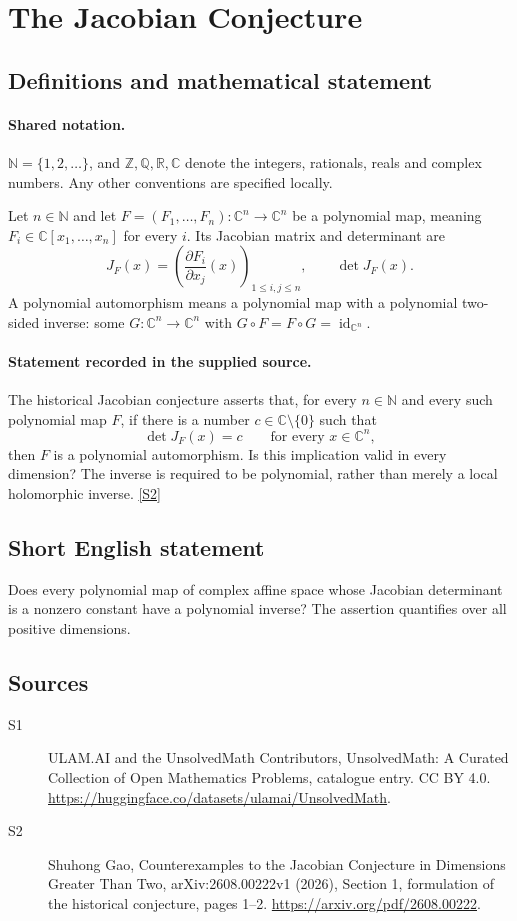 \documentclass[11pt]{article}
\newcommand{\sref}[2]{\hyperlink{source:#1:#2}{[S#2]}}
\begin{document}
\section{The Jacobian Conjecture}\label{statement}

\subsection{Definitions and mathematical statement}

\paragraph{Shared notation.}$\mathbb N=\{1,2,\ldots\}$, and $\mathbb Z,\mathbb Q,\mathbb R,\mathbb C$ denote the integers, rationals, reals and complex numbers. Any other conventions are specified locally.


Let $n\in\mathbb N$ and let $F=(F_1,\ldots,F_n):\mathbb C^n\to\mathbb C^n$ be a polynomial map, meaning $F_i\in\mathbb C[x_1,\ldots,x_n]$ for every $i$. Its Jacobian matrix and determinant are
\[
 J_F(x)=\left(\frac{\partial F_i}{\partial x_j}(x)\right)_{1\le i,j\le n},
 \qquad \det J_F(x).
\]
A polynomial automorphism means a polynomial map with a polynomial two-sided inverse: some $G:\mathbb C^n\to\mathbb C^n$ with $G\circ F=F\circ G=\operatorname{id}_{\mathbb C^n}$.
\paragraph{Statement recorded in the supplied source.}
The historical Jacobian conjecture asserts that, for every $n\in\mathbb N$ and every such polynomial map $F$, if there is a number $c\in\mathbb C\setminus\{0\}$ such that
\[
 \det J_F(x)=c\qquad\text{for every }x\in\mathbb C^n,
\]
then $F$ is a polynomial automorphism. Is this implication valid in every dimension? The inverse is required to be polynomial, rather than merely a local holomorphic inverse. \sref{statement}{2}
\subsection{Short English statement}
Does every polynomial map of complex affine space whose Jacobian determinant is a nonzero constant have a polynomial inverse? The assertion quantifies over all positive dimensions.
\subsection{Sources}
\begin{description}
\item[\hypertarget{source:statement:1}{S1}] ULAM.AI and the UnsolvedMath Contributors, UnsolvedMath: A Curated Collection of Open Mathematics Problems, catalogue entry. CC BY 4.0. \url{https://huggingface.co/datasets/ulamai/UnsolvedMath}.
\item[\hypertarget{source:statement:2}{S2}] Shuhong Gao, Counterexamples to the Jacobian Conjecture in Dimensions Greater Than Two, arXiv:2608.00222v1 (2026), Section 1, formulation of the historical conjecture, pages 1--2. \url{https://arxiv.org/pdf/2608.00222}.
\end{description}
\label{end:statement}
\end{document}
